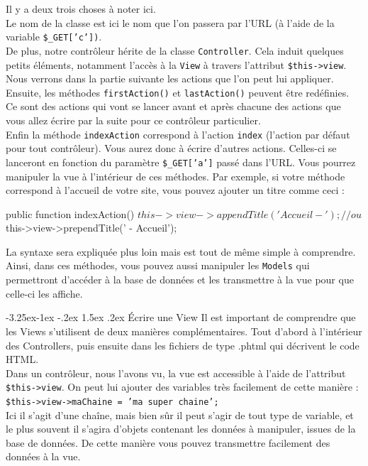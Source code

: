 \documentclass[a4paper,11pt]{article}
\makeatletter
\renewcommand{\subsection}{\@startsection{subsection}{2}{\z@}%
             {-3.25ex\@plus -1ex \@minus -.2ex}%
             {1.5ex \@plus .2ex}%
             {\color{bleuFonce}\normalfont\large\bfseries}}
\makeatother
\begin{document}
Il y a deux trois choses à noter ici.\\

Le nom de la classe est ici le nom que l'on passera par l'URL (à l'aide de la variable \texttt{\$\_GET['c'])}.\\

De plus, notre contrôleur hérite de la classe \texttt{Controller}. Cela induit quelques petits éléments, notamment l'accès à la \texttt{View} à travers l'attribut \texttt{\$this->view}. Nous verrons dans la partie suivante les actions que l'on peut lui appliquer. Ensuite, les méthodes \texttt{firstAction()} et \texttt{lastAction()} peuvent être redéfinies. Ce sont des actions qui vont se lancer avant et après chacune des actions que vous allez écrire par la suite pour ce contrôleur particulier.\\

Enfin la méthode \texttt{indexAction} correspond à l'action \texttt{index} (l'action par défaut pour tout contrôleur). Vous aurez donc à écrire d'autres actions. Celles-ci se lanceront en fonction du paramètre \texttt{\$\_GET['a']} passé dans l'URL. Vous pourrez manipuler la vue à l'intérieur de ces méthodes. Par exemple, si votre méthode correspond à l'accueil de votre site, vous pouvez ajouter un titre comme ceci :
\begin{PHP}
public function indexAction() {
  $this->view->appendTitle('Accueil - ');
  // ou
  $this->view->prependTitle(' - Accueil');
}
\end{PHP}

La syntaxe sera expliquée plus loin mais est tout de même simple à comprendre.\\

Ainsi, dans ces méthodes, vous pouvez aussi manipuler les \texttt{Models} qui permettront d'accéder à la base de données et les transmettre à la vue pour que celle-ci les affiche.

\subsection{Écrire une View}
Il est important de comprendre que les Views s'utilisent de deux manières complémentaires. Tout d'abord à l'intérieur des Controllers, puis ensuite dans les fichiers de type .phtml qui décrivent le code HTML.\\

Dans un contrôleur, nous l'avons vu, la vue est accessible à l'aide de l'attribut \texttt{\$this->view}. On peut lui ajouter des variables très facilement de cette manière : \texttt{\$this->view->maChaine = 'ma super chaine';}\\
Ici il s'agit d'une chaîne, mais bien sûr il peut s'agir de tout type de variable, et le plus souvent il s'agira d'objets contenant les données à manipuler, issues de la base de données. De cette manière vous pouvez transmettre facilement des données à la vue.\\
\end{document}
